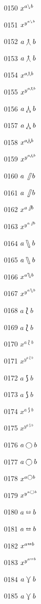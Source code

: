 \documentclass{article}
\begin{document}
0150 $x^{a\ssearrow b}$\par
0151 $x^{y^{a\ssearrow b}}$\par
0152 $a\curlywedgeuparrow b$\par
0153 $\displaystyle a\curlywedgeuparrow b$\par
0154 $x^{a\curlywedgeuparrow b}$\par
0155 $x^{y^{a\curlywedgeuparrow b}}$\par
0156 $a\curlywedgedownarrow b$\par
0157 $\displaystyle a\curlywedgedownarrow b$\par
0158 $x^{a\curlywedgedownarrow b}$\par
0159 $x^{y^{a\curlywedgedownarrow b}}$\par
0160 $a\fatslash b$\par
0161 $\displaystyle a\fatslash b$\par
0162 $x^{a\fatslash b}$\par
0163 $x^{y^{a\fatslash b}}$\par
0164 $a\fatbslash b$\par
0165 $\displaystyle a\fatbslash b$\par
0166 $x^{a\fatbslash b}$\par
0167 $x^{y^{a\fatbslash b}}$\par
0168 $a\lbag b$\par
0169 $\displaystyle a\lbag b$\par
0170 $x^{a\lbag b}$\par
0171 $x^{y^{a\lbag b}}$\par
0172 $a\rbag b$\par
0173 $\displaystyle a\rbag b$\par
0174 $x^{a\rbag b}$\par
0175 $x^{y^{a\rbag b}}$\par
0176 $a\varbigcirc b$\par
0177 $\displaystyle a\varbigcirc b$\par
0178 $x^{a\varbigcirc b}$\par
0179 $x^{y^{a\varbigcirc b}}$\par
0180 $a\leftrightarroweq b$\par
0181 $\displaystyle a\leftrightarroweq b$\par
0182 $x^{a\leftrightarroweq b}$\par
0183 $x^{y^{a\leftrightarroweq b}}$\par
0184 $a\curlyveedownarrow b$\par
0185 $\displaystyle a\curlyveedownarrow b$\par
\end{document}
